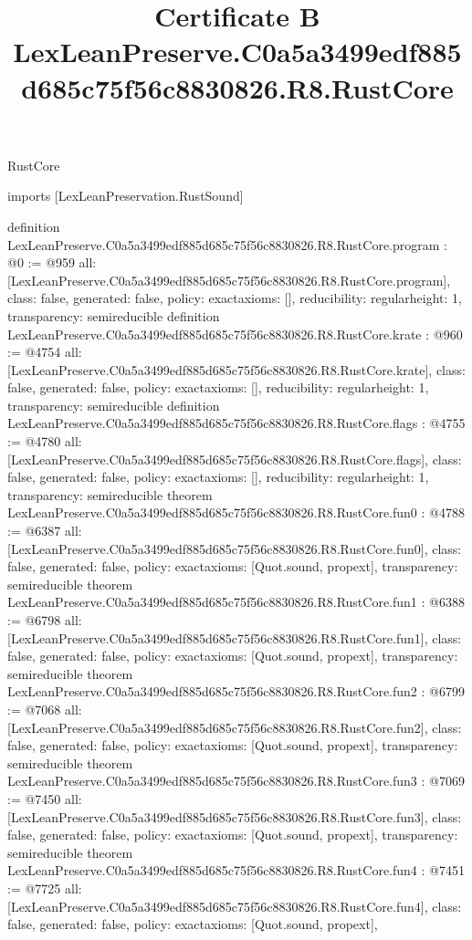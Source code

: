 \begin{lexlean}{RustCore}
\title{Certificate B LexLeanPreserve.C0a5a3499edf885d685c75f56c8830826.R8.RustCore}
\begin{coremodule}
imports [LexLeanPreservation.RustSound]

definition LexLeanPreserve.C0a5a3499edf885d685c75f56c8830826.R8.RustCore.program : @0 := @959 {
  all: [LexLeanPreserve.C0a5a3499edf885d685c75f56c8830826.R8.RustCore.program],
  class: false,
  generated: false,
  policy: exact{axioms: []},
  reducibility: regular{height: 1},
  transparency: semireducible
}
definition LexLeanPreserve.C0a5a3499edf885d685c75f56c8830826.R8.RustCore.krate : @960 := @4754 {
  all: [LexLeanPreserve.C0a5a3499edf885d685c75f56c8830826.R8.RustCore.krate],
  class: false,
  generated: false,
  policy: exact{axioms: []},
  reducibility: regular{height: 1},
  transparency: semireducible
}
definition LexLeanPreserve.C0a5a3499edf885d685c75f56c8830826.R8.RustCore.flags : @4755 := @4780 {
  all: [LexLeanPreserve.C0a5a3499edf885d685c75f56c8830826.R8.RustCore.flags],
  class: false,
  generated: false,
  policy: exact{axioms: []},
  reducibility: regular{height: 1},
  transparency: semireducible
}
theorem LexLeanPreserve.C0a5a3499edf885d685c75f56c8830826.R8.RustCore.fun0 : @4788 := @6387 {
  all: [LexLeanPreserve.C0a5a3499edf885d685c75f56c8830826.R8.RustCore.fun0],
  class: false,
  generated: false,
  policy: exact{axioms: [Quot.sound, propext]},
  transparency: semireducible
}
theorem LexLeanPreserve.C0a5a3499edf885d685c75f56c8830826.R8.RustCore.fun1 : @6388 := @6798 {
  all: [LexLeanPreserve.C0a5a3499edf885d685c75f56c8830826.R8.RustCore.fun1],
  class: false,
  generated: false,
  policy: exact{axioms: [Quot.sound, propext]},
  transparency: semireducible
}
theorem LexLeanPreserve.C0a5a3499edf885d685c75f56c8830826.R8.RustCore.fun2 : @6799 := @7068 {
  all: [LexLeanPreserve.C0a5a3499edf885d685c75f56c8830826.R8.RustCore.fun2],
  class: false,
  generated: false,
  policy: exact{axioms: [Quot.sound, propext]},
  transparency: semireducible
}
theorem LexLeanPreserve.C0a5a3499edf885d685c75f56c8830826.R8.RustCore.fun3 : @7069 := @7450 {
  all: [LexLeanPreserve.C0a5a3499edf885d685c75f56c8830826.R8.RustCore.fun3],
  class: false,
  generated: false,
  policy: exact{axioms: [Quot.sound, propext]},
  transparency: semireducible
}
theorem LexLeanPreserve.C0a5a3499edf885d685c75f56c8830826.R8.RustCore.fun4 : @7451 := @7725 {
  all: [LexLeanPreserve.C0a5a3499edf885d685c75f56c8830826.R8.RustCore.fun4],
  class: false,
  generated: false,
  policy: exact{axioms: [Quot.sound, propext]},
}
\end{coremodule}
\end{lexlean}
